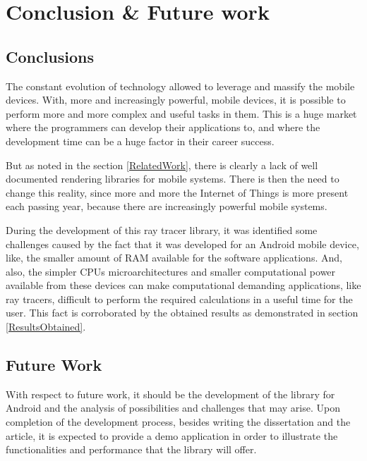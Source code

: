 \chapter{Conclusion \& Future work}

\section{Conclusions}

\par
The constant evolution of technology allowed to leverage and massify the mobile devices.
With, more and increasingly powerful, mobile devices, it is possible to perform more and more complex and useful tasks in them.
This is a huge market where the programmers can develop their applications to, and where the development time can be a huge factor in their career success.

\par
But as noted in the section \ref{RelatedWork}, there is clearly a lack of well documented rendering libraries for mobile systems.
There is then the need to change this reality, since more and more the Internet of Things is more present each passing year, because there are increasingly powerful mobile systems.

\par
During the development of this ray tracer library, it was identified some challenges caused by the fact that it was developed for an Android mobile device, like, the smaller amount of RAM available for the software applications.
And, also, the simpler CPUs microarchitectures and smaller computational power available from these devices can make computational demanding applications, like ray tracers, difficult to perform the required calculations in a useful time for the user.
This fact is corroborated by the obtained results as demonstrated in section \ref{ResultsObtained}.

\section{Future Work}

\par
With respect to future work, it should be the development of the library for Android and the analysis of possibilities and challenges that may arise.
Upon completion of the development process, besides writing the dissertation and the article, it is expected to provide a demo application in order to illustrate the functionalities and performance that the library will offer.


